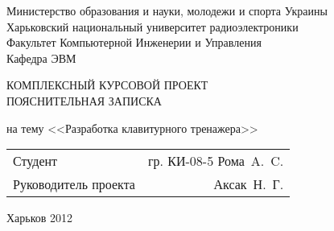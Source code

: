 \large
\begin{titlepage}

\begin{center}
Министерство образования и науки, молодежи и спорта Украины \\
Харьковский национальный университет радиоэлектроники \\

\vspace{2cm}
Факультет Компьютерной Инженерии и Управления \\
Кафедра ЭВМ

\vspace{4cm}
{\LARGE КОМПЛЕКСНЫЙ КУРСОВОЙ ПРОЕКТ} \\
ПОЯСНИТЕЛЬНАЯ ЗАПИСКА
\end{center}

\vspace{2cm}

\begin{center}
{\Large
на тему <<Разработка клавитурного тренажера>>}
\end{center}

\vspace{4cm}

{\large
\begin{tabular}{l r}
    Студент & гр. КИ-08-5 Рома~A.~C. \\
    Руководитель проекта & Аксак~Н.~Г. \\
\end{tabular}}

\vfill

\begin{center}
Харьков 2012
\end{center}

\end{titlepage}
